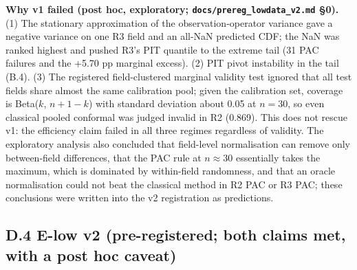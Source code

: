 \documentclass[preprint,12pt,authoryear]{elsarticle}
\begin{document}
\textbf{Why v1 failed (post hoc, exploratory; \texttt{docs/prereg\_lowdata\_v2.md} §0).} (1) The stationary approximation of the observation-operator variance gave a negative variance on one R3 field and an all-NaN predicted CDF; the NaN was ranked highest and pushed R3's PIT quantile to the extreme tail (31 PAC failures and the +5.70 pp marginal excess). (2) PIT pivot instability in the tail (B.4). (3) The registered field-clustered marginal validity test ignored that all test fields share almost the same calibration pool; given the calibration set, coverage is Beta(\(k\), \(n+1-k\)) with standard deviation about 0.05 at \(n=30\), so even classical pooled conformal was judged invalid in R2 (0.869). This does not rescue v1: the efficiency claim failed in all three regimes regardless of validity. The exploratory analysis also concluded that field-level normalisation can remove only between-field differences, that the PAC rule at \(n\approx30\) essentially takes the maximum, which is dominated by within-field randomness, and that an oracle normalisation could not beat the classical method in R2 PAC or R3 PAC; these conclusions were written into the v2 registration as predictions.

\subsection*{D.4 E-low v2 (pre-registered; both claims met, with a post hoc caveat)}
\end{document}
